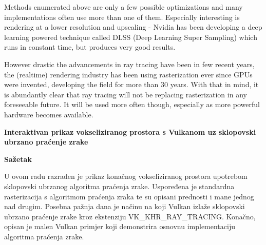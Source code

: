 \documentclass[times, utf8, zavrsni, numeric]{fer}
\begin{document}
Methods enumerated above are only a few possible optimizations and many implementations often use more than one of them. Especially interesting is rendering at a lower resolution and upscaling - Nvidia has been developing a deep learning powered technique called DLSS (Deep Learning Super Sampling) which runs in constant time, but produces very good results.

However drastic the advancements in ray tracing have been in few recent years, the (realtime) rendering industry has been using rasterization ever since GPUs were invented, developing the field for more than 30 years. With that in mind, it is abundantly clear that ray tracing will not be replacing rasterization in any foreseeable future. It will be used more often though, especially as more powerful hardware becomes available.




\newpage
\vspace*{\fill}
\thispagestyle{empty}
\begin{center}
{\bf Interaktivan prikaz vokseliziranog prostora s Vulkanom uz sklopovski ubrzano praćenje zrake}
\end{center}
\hspace*{\fill} {\bf Sa\v{z}etak} \hspace*{\fill} \par
\vspace*{25pt}

U ovom radu razrađen je prikaz konačnog vokseliziranog prostora upotrebom sklopovski ubrzanog algoritma praćenja zrake. Uspoređena je standardna rasterizacija s algoritmom praćenja zraka te su opisani prednosti i mane jednog nad drugim. Posebna pažnja dana je načinu na koji Vulkan izlaže sklopovski ubrzano praćenje zrake kroz ekstenziju VK\_KHR\_RAY\_TRACING. Konačno, opisan je malen Vulkan primjer koji demonstrira osnovnu implementaciju algoritma praćenja zrake.


\begin{abstract}
This paper explores the real-time representation of finite voxelized space using hardware-accelerated ray tracing. It compares standard rasterization to ray tracing and outlines the benefits and drawbacks of one over the other. It's explored how Vulkan exposes hardware ray tracing capabilities through its VK\_KHR\_RAY\_TRACING extension. Finally, a small Vulkan example is described that shows a basic implementation of the ray tracing algorithm.

\end{abstract}
\end{document}
